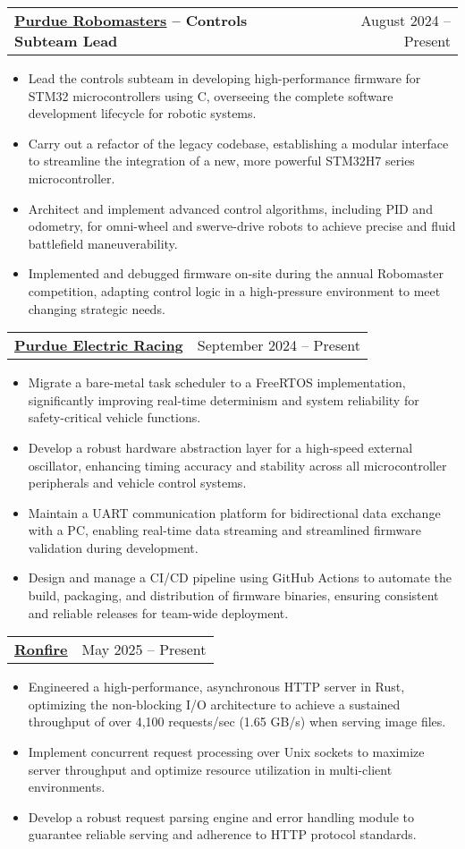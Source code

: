 \documentclass[letterpaper,11pt]{article}
\makeatletter
\newcommand{\resumeItem}[1]{
  \item\small{
    {#1 \vspace{-2pt}}
  }
}
\newcommand{\resumeProjectHeading}[2]{
    \item
        \begin{tabular*}{0.97\textwidth}[t]{l@{\extracolsep{\fill}}r}
            \textbf{#1} & #2 \\
    \end{tabular*}\vspace{-7pt}
}
\newcommand{\resumeItemListStart}{\begin{itemize}}
\newcommand{\resumeItemListEnd}{\end{itemize}\vspace{-5pt}}
\makeatother
\begin{document}
\resumeProjectHeading
{\href{https://github.com/PurdueRM/Embedded-Control}{\uline{Purdue Robomasters}} -- Controls Subteam Lead}{August 2024 -- Present}
\resumeItemListStart
\resumeItem{Lead the controls subteam in developing high-performance firmware for STM32 microcontrollers using C, overseeing the complete software development lifecycle for robotic systems.}
\resumeItem{Carry out a refactor of the legacy codebase, establishing a modular interface to streamline the integration of a new, more powerful STM32H7 series microcontroller.}
\resumeItem{Architect and implement advanced control algorithms, including PID and odometry, for omni-wheel and swerve-drive robots to achieve precise and fluid battlefield maneuverability.}
\resumeItem{Implemented and debugged firmware on-site during the annual Robomaster competition, adapting control logic in a high-pressure environment to meet changing strategic needs.}
\resumeItemListEnd

\resumeProjectHeading
{\href{https://github.com/PurdueElectricRacing/firmware}{\uline{Purdue Electric Racing}}}{September 2024 -- Present}
\resumeItemListStart
\resumeItem{Migrate a bare-metal task scheduler to a FreeRTOS implementation, significantly improving real-time determinism and system reliability for safety-critical vehicle functions.}
\resumeItem{Develop a robust hardware abstraction layer for a high-speed external oscillator, enhancing timing accuracy and stability across all microcontroller peripherals and vehicle control systems.}
\resumeItem{Maintain a UART communication platform for bidirectional data exchange with a PC, enabling real-time data streaming and streamlined firmware validation during development.}
\resumeItem{Design and manage a CI/CD pipeline using GitHub Actions to automate the build, packaging, and distribution of firmware binaries, ensuring consistent and reliable releases for team-wide deployment.}
\resumeItemListEnd

\resumeProjectHeading
{\href{https://github.com/ironic1234/ronfire}{\uline{Ronfire}}}{May 2025 -- Present}
\resumeItemListStart
\resumeItem{Engineered a high-performance, asynchronous HTTP server in Rust, optimizing the non-blocking I/O architecture to achieve a sustained throughput of over 4,100 requests/sec (1.65 GB/s) when serving image files.}
\resumeItem{Implement concurrent request processing over Unix sockets to maximize server throughput and optimize resource utilization in multi-client environments.}
\resumeItem{Develop a robust request parsing engine and error handling module to guarantee reliable serving and adherence to HTTP protocol standards.}
\resumeItemListEnd
\end{document}
